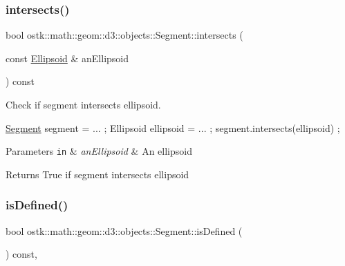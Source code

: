\subsubsection{\texorpdfstring{intersects()}{intersects()}\hspace{0.1cm}{\footnotesize\ttfamily [3/3]}}
{\footnotesize\ttfamily bool ostk\+::math\+::geom\+::d3\+::objects\+::\+Segment\+::intersects (\begin{DoxyParamCaption}\item[{const \hyperlink{classostk_1_1math_1_1geom_1_1d3_1_1objects_1_1_ellipsoid}{Ellipsoid} \&}]{an\+Ellipsoid }\end{DoxyParamCaption}) const}



Check if segment intersects ellipsoid. 


\begin{DoxyCode}
\hyperlink{classostk_1_1math_1_1geom_1_1d3_1_1objects_1_1_segment_aa2cb60ce06335a5f76120c658219494c}{Segment} segment = ... ;
Ellipsoid ellipsoid = ... ;
segment.intersects(ellipsoid) ;
\end{DoxyCode}



\begin{DoxyParams}[1]{Parameters}
\mbox{\tt in}  & {\em an\+Ellipsoid} & An ellipsoid \\
\hline
\end{DoxyParams}
\begin{DoxyReturn}{Returns}
True if segment intersects ellipsoid 
\end{DoxyReturn}
\mbox{\label{classostk_1_1math_1_1geom_1_1d3_1_1objects_1_1_segment_ab89a57a59d50bfd6fe609e92d158e6ec}} 
\subsubsection{\texorpdfstring{is\+Defined()}{isDefined()}}
{\footnotesize\ttfamily bool ostk\+::math\+::geom\+::d3\+::objects\+::\+Segment\+::is\+Defined (\begin{DoxyParamCaption}{ }\end{DoxyParamCaption}) const\hspace{0.3cm}{\ttfamily [override]}, {\ttfamily [virtual]}}



